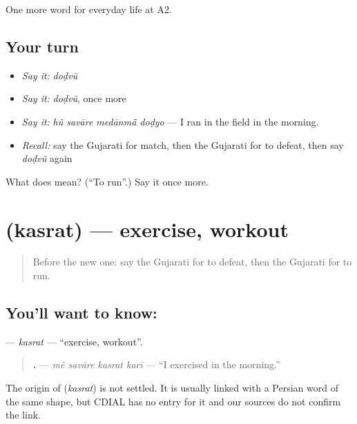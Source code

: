 \begin{grammarlens}[title={What you've built}]
One more word for everyday life at A2.
\end{grammarlens}

\subsection*{Your turn}
\begin{itemize}
\raggedright
  \item \emph{Say it:} \emph{doḍvũ}
  \item \emph{Say it:} \emph{doḍvũ}, once more
  \item \emph{Say it:} \emph{hũ savāre medānmā̃ doḍyo} — I ran in the field in the morning.
  \item \emph{Recall:} say the Gujarati for match, then the Gujarati for to defeat, then say \emph{doḍvũ} again
\end{itemize}

\begin{tcolorbox}[breakable,colback=teal!4,colframe=teal!35!black,title={Before you move on}]
What does  mean? (\textquotedblleft{}To run\textquotedblright{}.) Say it once more.
\end{tcolorbox}
\section[\texorpdfstring{\gu{કસરત} (kasrat)}{કસરત (kasrat)}]{ (kasrat) — exercise, workout}

\label{lesson:GU-C259-kasrat}



\begin{quote}
Before the new one: say the Gujarati for to defeat, then the Gujarati for to run.
\end{quote}

\subsection*{You'll want to know: }
\textbf{} — \emph{kasrat} — \textquotedblleft{}exercise, workout\textquotedblright{}.

\begin{quote}
\textbf{   .} — \emph{mẽ savāre kasrat karī} — \textquotedblleft{}I exercised in the morning.\textquotedblright{}
\end{quote}

\begin{cousinweb}
The origin of \textbf{} (\emph{kasrat}) is not settled. It is usually linked with a Persian word of the same shape, but CDIAL has no entry for it and our sources do not confirm the link.
\end{cousinweb}

